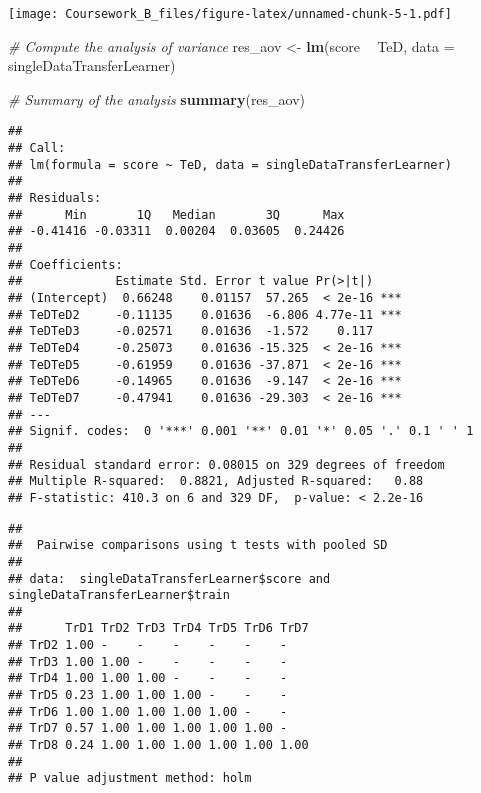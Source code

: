 \documentclass[]{article}
\newenvironment{Shaded}{\begin{snugshade}}{\end{snugshade}}
\newcommand{\KeywordTok}[1]{\textcolor[rgb]{0.13,0.29,0.53}{\textbf{#1}}}
\newcommand{\DataTypeTok}[1]{\textcolor[rgb]{0.13,0.29,0.53}{#1}}
\newcommand{\StringTok}[1]{\textcolor[rgb]{0.31,0.60,0.02}{#1}}
\newcommand{\CommentTok}[1]{\textcolor[rgb]{0.56,0.35,0.01}{\textit{#1}}}
\newcommand{\OperatorTok}[1]{\textcolor[rgb]{0.81,0.36,0.00}{\textbf{#1}}}
\newcommand{\NormalTok}[1]{#1}
\begin{document}
\texttt{[image: Coursework\_B\_files/figure-latex/unnamed-chunk-5-1.pdf]}

\begin{Shaded}
\begin{Highlighting}[]
\CommentTok{# Compute the analysis of variance}
\NormalTok{res_aov <-}\StringTok{ }\KeywordTok{lm}\NormalTok{(score }\OperatorTok{~}\StringTok{ }\NormalTok{TeD, }\DataTypeTok{data =}\NormalTok{ singleDataTransferLearner)}

\CommentTok{# Summary of the analysis}
\KeywordTok{summary}\NormalTok{(res_aov)}
\end{Highlighting}
\end{Shaded}

\begin{verbatim}
## 
## Call:
## lm(formula = score ~ TeD, data = singleDataTransferLearner)
## 
## Residuals:
##      Min       1Q   Median       3Q      Max 
## -0.41416 -0.03311  0.00204  0.03605  0.24426 
## 
## Coefficients:
##             Estimate Std. Error t value Pr(>|t|)    
## (Intercept)  0.66248    0.01157  57.265  < 2e-16 ***
## TeDTeD2     -0.11135    0.01636  -6.806 4.77e-11 ***
## TeDTeD3     -0.02571    0.01636  -1.572    0.117    
## TeDTeD4     -0.25073    0.01636 -15.325  < 2e-16 ***
## TeDTeD5     -0.61959    0.01636 -37.871  < 2e-16 ***
## TeDTeD6     -0.14965    0.01636  -9.147  < 2e-16 ***
## TeDTeD7     -0.47941    0.01636 -29.303  < 2e-16 ***
## ---
## Signif. codes:  0 '***' 0.001 '**' 0.01 '*' 0.05 '.' 0.1 ' ' 1
## 
## Residual standard error: 0.08015 on 329 degrees of freedom
## Multiple R-squared:  0.8821, Adjusted R-squared:   0.88 
## F-statistic: 410.3 on 6 and 329 DF,  p-value: < 2.2e-16
\end{verbatim}

\begin{Shaded}
\end{Shaded}

\begin{verbatim}
## 
##  Pairwise comparisons using t tests with pooled SD 
## 
## data:  singleDataTransferLearner$score and singleDataTransferLearner$train 
## 
##      TrD1 TrD2 TrD3 TrD4 TrD5 TrD6 TrD7
## TrD2 1.00 -    -    -    -    -    -   
## TrD3 1.00 1.00 -    -    -    -    -   
## TrD4 1.00 1.00 1.00 -    -    -    -   
## TrD5 0.23 1.00 1.00 1.00 -    -    -   
## TrD6 1.00 1.00 1.00 1.00 1.00 -    -   
## TrD7 0.57 1.00 1.00 1.00 1.00 1.00 -   
## TrD8 0.24 1.00 1.00 1.00 1.00 1.00 1.00
## 
## P value adjustment method: holm
\end{verbatim}
\end{document}
